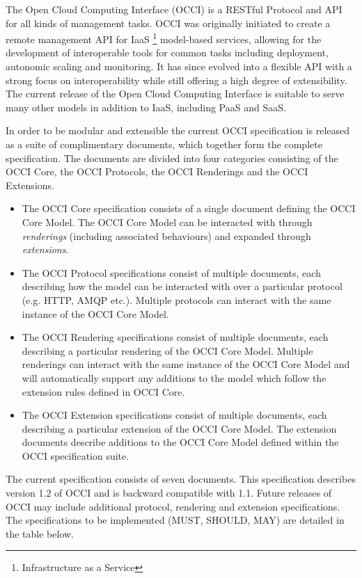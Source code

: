 The Open Cloud Computing Interface (OCCI) is a RESTful Protocol and
API for all kinds of management tasks. OCCI was originally initiated
to create a remote management API for IaaS%
\footnote{Infrastructure as a Service}
model-based services, allowing for the development of interoperable tools for
common tasks including deployment, autonomic scaling and monitoring.
%
It has since evolved into a flexible API with a strong focus on
interoperability while still offering a high degree of extensibility. The
current release of the Open Cloud Computing Interface is suitable to serve many
other models in addition to IaaS, including PaaS and SaaS.

In order to be modular and extensible the current OCCI specification is
released as a suite of complimentary documents, which together form the complete
specification.
%
The documents are divided into four categories consisting of the OCCI Core,
the OCCI Protocols, the OCCI Renderings and the OCCI Extensions.
%
\begin{itemize}
\item The OCCI Core specification consists of a single document defining the
 OCCI Core Model. The OCCI Core Model can be interacted with through {\em
 renderings} (including associated behaviours) and expanded through {\em extensions}.
\item The OCCI Protocol specifications consist of multiple documents, each
 describing how the model can be interacted with over a particular protocol (e.g. HTTP, AMQP etc.). 
 Multiple protocols can interact with the same instance of the OCCI Core Model.
\item The OCCI Rendering specifications consist of multiple documents, each
 describing a particular rendering of the OCCI Core Model. Multiple renderings can
 interact with the same instance of the OCCI Core Model and will automatically support
 any additions to the model which follow the extension rules defined in OCCI
 Core.
\item The OCCI Extension specifications consist of multiple documents,
  each describing a particular extension of the OCCI Core Model. The
  extension documents describe additions to the OCCI Core Model
  defined within the OCCI specification suite.
\end{itemize}
%

The current specification consists of seven documents. This 
specification describes version 1.2 of OCCI and is backward compatible with 1.1. 
Future releases of OCCI
may include additional protocol, rendering and extension specifications. The specifications to be 
implemented (MUST, SHOULD, MAY) are detailed in the table below.


